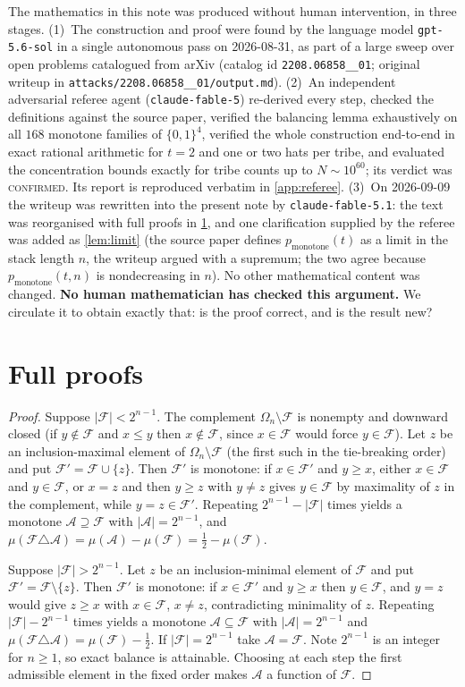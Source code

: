 \documentclass[11pt,a4paper]{article}
\theoremstyle{plain}
\theoremstyle{definition}
\theoremstyle{remark}
\newcommand{\cA}{\mathcal A}
\newcommand{\cF}{\mathcal F}
\newcommand{\pmon}{p_{\mathrm{monotone}}}
\newcommand{\Om}{\Omega}
\begin{document}
The mathematics in this note was produced without human intervention, in three stages.
(1)~The construction and proof were found by the language model \texttt{gpt-5.6-sol} in a single autonomous pass on 2026-08-31, as part of a large sweep over open problems catalogued from arXiv (catalog id \texttt{2208.06858\_\_01}; original writeup in \texttt{attacks/2208.06858\_\_01/output.md}).
(2)~An independent adversarial referee agent (\texttt{claude-fable-5}) re-derived every step, checked the definitions against the source paper, verified the balancing lemma exhaustively on all $168$ monotone families of $\{0,1\}^4$, verified the whole construction end-to-end in exact rational arithmetic for $t=2$ and one or two hats per tribe, and evaluated the concentration bounds exactly for tribe counts up to $N\sim10^{60}$; its verdict was \textsc{confirmed}. Its report is reproduced verbatim in \cref{app:referee}.
(3)~On 2026-09-09 the writeup was rewritten into the present note by \texttt{claude-fable-5.1}: the text was reorganised with full proofs in \cref{app:proofs}, and one clarification supplied by the referee was added as \cref{lem:limit} (the source paper defines $\pmon(t)$ as a limit in the stack length $n$, the writeup argued with a supremum; the two agree because $\pmon(t,n)$ is nondecreasing in $n$). No other mathematical content was changed.
\textbf{No human mathematician has checked this argument.} We circulate it to obtain exactly that: is the proof correct, and is the result new?


\appendix

\section{Full proofs}\label{app:proofs}

\label{pf:balance}
\lembalance*
\begin{proof}
Suppose $|\cF|<2^{n-1}$. The complement $\Om_n\setminus\cF$ is nonempty and downward closed (if $y\notin\cF$ and $x\le y$ then $x\notin\cF$, since $x\in\cF$ would force $y\in\cF$). Let $z$ be an inclusion-maximal element of $\Om_n\setminus\cF$ (the first such in the tie-breaking order) and put $\cF'=\cF\cup\{z\}$. Then $\cF'$ is monotone: if $x\in\cF'$ and $y\ge x$, either $x\in\cF$ and $y\in\cF$, or $x=z$ and then $y\ge z$ with $y\ne z$ gives $y\in\cF$ by maximality of $z$ in the complement, while $y=z\in\cF'$. Repeating $2^{n-1}-|\cF|$ times yields a monotone $\cA\supseteq\cF$ with $|\cA|=2^{n-1}$, and $\mu(\cF\triangle\cA)=\mu(\cA)-\mu(\cF)=\frac12-\mu(\cF)$.

Suppose $|\cF|>2^{n-1}$. Let $z$ be an inclusion-minimal element of $\cF$ and put $\cF'=\cF\setminus\{z\}$. Then $\cF'$ is monotone: if $x\in\cF'$ and $y\ge x$ then $y\in\cF$, and $y=z$ would give $z\ge x$ with $x\in\cF$, $x\ne z$, contradicting minimality of $z$. Repeating $|\cF|-2^{n-1}$ times yields a monotone $\cA\subseteq\cF$ with $|\cA|=2^{n-1}$ and $\mu(\cF\triangle\cA)=\mu(\cF)-\frac12$. If $|\cF|=2^{n-1}$ take $\cA=\cF$. Note $2^{n-1}$ is an integer for $n\ge1$, so exact balance is attainable. Choosing at each step the first admissible element in the fixed order makes $\cA$ a function of $\cF$.
\end{proof}
\end{document}
